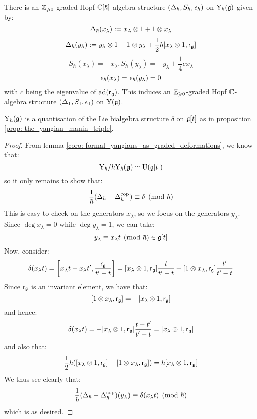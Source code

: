         \begin{theorem} \label{theorem: yangian_hopf_structure}
            There is an $\mathbb{Z}_{\geqslant 0}$-graded Hopf $\mathbb{C}[\hbar]$-algebra structure $(\Delta_{\hbar}, S_{\hbar}, \epsilon_{\hbar})$ on $\mathrm{Y}_{\hbar}(\mathfrak{g})$ given by:
                $$\Delta_{\hbar}(x_{\lambda}) := x_{\lambda} \tensor 1 + 1 \tensor x_{\lambda}$$
                $$\Delta_{\hbar}(y_{\lambda}) := y_{\lambda} \tensor 1 + 1 \tensor y_{\lambda} + \frac12 \hbar [x_{\lambda} \tensor 1, \sfr_{\g}]$$
                $$S_{\hbar}(x_{\lambda}) = -x_{\lambda}, S_{\hbar}(y_{\lambda}) = -y_{\lambda} + \frac14 c_{} x_{\lambda}$$
                $$\epsilon_{\hbar}(x_{\lambda}) = \epsilon_{\hbar}(y_{\lambda}) = 0$$
            with $c$ being the eigenvalue of $\mathrm{ad}(\mathsf{r}_{\mathfrak{g}})$. This induces an $\mathbb{Z}_{\geqslant 0}$-graded Hopf $\mathbb{C}$-algebra structure $(\Delta_1, S_1, \epsilon_1)$ on $\mathrm{Y}(\mathfrak{g})$.
        \end{theorem}
        \begin{corollary} \label{coro: yangians_as_quantisations}
            $\mathrm{Y}_{\hbar}(\mathfrak{g})$ is a quantisation of the Lie bialgebra structure $\delta$ on $\mathfrak{g}[t]$ as in proposition \ref{prop: the_yangian_manin_triple}.
        \end{corollary}
            \begin{proof}
                From lemma \ref{coro: formal_yangians_as_graded_deformations}, we know that:
                    $$\mathrm{Y}_{\hbar}/\hbar\mathrm{Y}_{\hbar}(\mathfrak{g}) \simeq \mathrm{U}(\mathfrak{g}[t])$$
                so it only remains to show that:
                    $$\frac{1}{\hbar}( \Delta_{\hbar} - \Delta_{\hbar}^{\mathrm{cop}} ) \equiv \delta \pmod{\hbar}$$
                This is easy to check on the generators $x_{\lambda}$, so we focus on the generators $y_{\lambda}$. Since $\deg x_{\lambda} = 0$ while $\deg y_{\lambda} = 1$, we can take:
                    $$y_{\lambda} \equiv x_{\lambda} t \pmod{\hbar} \in \mathfrak{g}[t]$$
                Now, consider:
                    $$\delta(x_{\lambda} t) = \left[ x_{\lambda} t + x_{\lambda} t', \frac{\sfr_{\g}}{t' - t} \right] = [x_{\lambda} \tensor 1, \sfr_{\g}] \frac{t}{t' - t} + [1 \tensor x_{\lambda}, \sfr_{\g}] \frac{t'}{t' - t}$$
                Since $\mathsf{r}_{\mathfrak{g}}$ is an invariant element, we have that:
                    $$[1 \tensor x_{\lambda}, \sfr_{\g}] = -[x_{\lambda} \tensor 1, \sfr_{\g}]$$
                and hence:
                    $$\delta(x_{\lambda} t) = -[x_{\lambda} \tensor 1, \sfr_{\g}] \frac{t - t'}{t' - t} = [x_{\lambda} \tensor 1, \sfr_{\g}]$$
                and also that:
                    $$\frac12 \hbar ( [x_{\lambda} \tensor 1, \sfr_{\g}] - [1 \tensor x_{\lambda}, \sfr_{\g}] ) = \hbar [x_{\lambda} \tensor 1, \sfr_{\g}]$$
                We thus see clearly that:
                    $$\frac{1}{\hbar}( \Delta_{\hbar} - \Delta_{\hbar}^{\mathrm{cop}} )(y_{\lambda}) \equiv \delta(x_{\lambda} t) \pmod{\hbar}$$
                which is as desired. 
            \end{proof}
